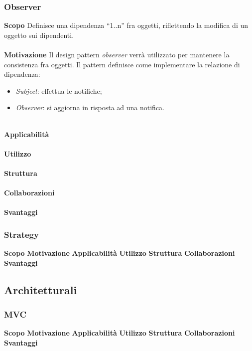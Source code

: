 \subsubsection{Observer}
\textbf{Scopo}	Definisce una dipendenza “1..n” fra oggetti, riflettendo la modifica di un oggetto sui dipendenti.
\\\\
\textbf{Motivazione}	Il design pattern \textit{observer} verrà utilizzato per mantenere la consistenza fra oggetti. Il pattern definisce come implementare la relazione di dipendenza:
	\begin{itemize}
		\item \textit{Subject}: effettua le notifiche;
		\item \textit{Observer}: si aggiorna in risposta ad una notifica.
	\end{itemize}
\\
\textbf{Applicabilità}	
\\\\
\textbf{Utilizzo}
\\\\
\textbf{Struttura}
\\\\
\textbf{Collaborazioni}
\\\\
\textbf{Svantaggi}
\subsubsection{Strategy}
\textbf{Scopo}
\textbf{Motivazione}
\textbf{Applicabilità}
\textbf{Utilizzo}
\textbf{Struttura}
\textbf{Collaborazioni}
\textbf{Svantaggi}

\subsection{Architetturali}
\subsubsection{MVC}
\textbf{Scopo}
\textbf{Motivazione}
\textbf{Applicabilità}
\textbf{Utilizzo}
\textbf{Struttura}
\textbf{Collaborazioni}
\textbf{Svantaggi}
